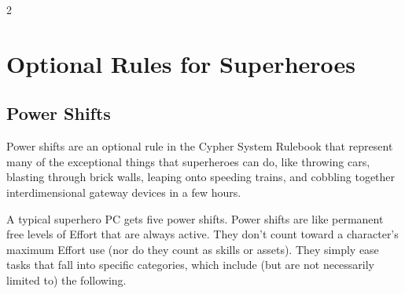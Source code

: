 \begin{multicols}{2}

\chapter{Optional Rules for Superheroes}

\section{Power Shifts}

Power shifts are an optional rule in the Cypher System Rulebook that represent many of the exceptional things that superheroes can do, like throwing cars, blasting through brick walls, leaping onto speeding trains, and cobbling together interdimensional gateway devices in a few hours.

A typical superhero PC gets five power shifts. Power shifts are like permanent free levels of Effort that are always active. They don’t count toward a character’s maximum Effort use (nor do they count as skills or assets). They simply ease tasks that fall into specific categories, which include (but are not necessarily limited to) the following.


\end{multicols}
